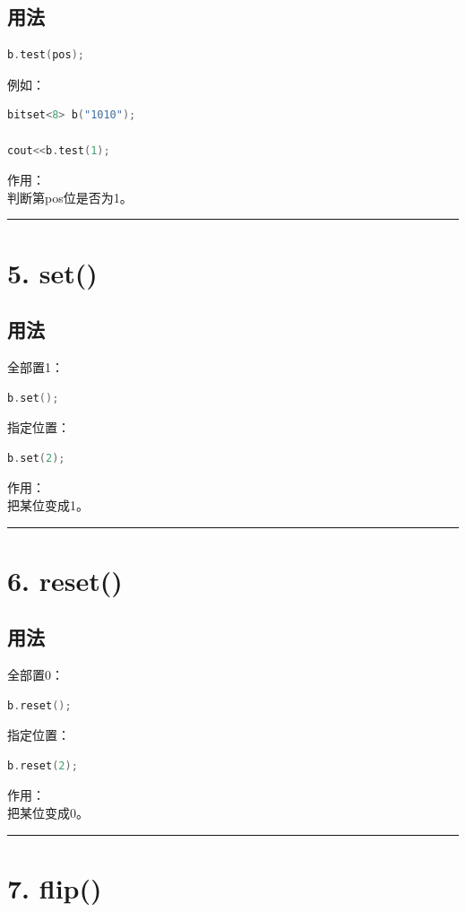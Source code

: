 \documentclass[10pt,twocolumn]{extarticle}
\begin{document}
\subsection{用法}
\begin{lstlisting}[language=C++]
b.test(pos);
\end{lstlisting}
例如：
\begin{lstlisting}[language=C++]
bitset<8> b("1010");

cout<<b.test(1);
\end{lstlisting}
作用：\\
判断第pos位是否为1。

\noindent\rule{\linewidth}{0.4pt}

\section{5. set()}

\subsection{用法}
全部置1：
\begin{lstlisting}[language=C++]
b.set();
\end{lstlisting}
指定位置：
\begin{lstlisting}[language=C++]
b.set(2);
\end{lstlisting}
作用：\\
把某位变成1。

\noindent\rule{\linewidth}{0.4pt}

\section{6. reset()}

\subsection{用法}
全部置0：
\begin{lstlisting}[language=C++]
b.reset();
\end{lstlisting}
指定位置：
\begin{lstlisting}[language=C++]
b.reset(2);
\end{lstlisting}
作用：\\
把某位变成0。

\noindent\rule{\linewidth}{0.4pt}

\section{7. flip()}
\end{document}

